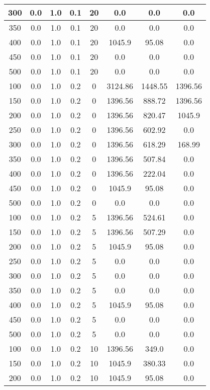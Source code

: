 \documentclass[a4paper, 12pt]{extreport}
\begin{document}
\begin{itemize}
\begin{longtable}{|c|c|c|c|c|c|c|c|}
			300 & 0.0 & 1.0 & 0.1 & 20 & 0.0 & 0.0 & 0.0 \\\hline
			350 & 0.0 & 1.0 & 0.1 & 20 & 0.0 & 0.0 & 0.0 \\\hline
			400 & 0.0 & 1.0 & 0.1 & 20 & 1045.9 & 95.08 & 0.0 \\\hline
			450 & 0.0 & 1.0 & 0.1 & 20 & 0.0 & 0.0 & 0.0 \\\hline
			500 & 0.0 & 1.0 & 0.1 & 20 & 0.0 & 0.0 & 0.0 \\\hline
			100 & 0.0 & 1.0 & 0.2 & 0 & 3124.86 & 1448.55 & 1396.56 \\\hline
			150 & 0.0 & 1.0 & 0.2 & 0 & 1396.56 & 888.72 & 1396.56 \\\hline
			200 & 0.0 & 1.0 & 0.2 & 0 & 1396.56 & 820.47 & 1045.9 \\\hline
			250 & 0.0 & 1.0 & 0.2 & 0 & 1396.56 & 602.92 & 0.0 \\\hline
			300 & 0.0 & 1.0 & 0.2 & 0 & 1396.56 & 618.29 & 168.99 \\\hline
			350 & 0.0 & 1.0 & 0.2 & 0 & 1396.56 & 507.84 & 0.0 \\\hline
			400 & 0.0 & 1.0 & 0.2 & 0 & 1396.56 & 222.04 & 0.0 \\\hline
			450 & 0.0 & 1.0 & 0.2 & 0 & 1045.9 & 95.08 & 0.0 \\\hline
			500 & 0.0 & 1.0 & 0.2 & 0 & 0.0 & 0.0 & 0.0 \\\hline
			100 & 0.0 & 1.0 & 0.2 & 5 & 1396.56 & 524.61 & 0.0 \\\hline
			150 & 0.0 & 1.0 & 0.2 & 5 & 1396.56 & 507.29 & 0.0 \\\hline
			200 & 0.0 & 1.0 & 0.2 & 5 & 1045.9 & 95.08 & 0.0 \\\hline
			250 & 0.0 & 1.0 & 0.2 & 5 & 0.0 & 0.0 & 0.0 \\\hline
			300 & 0.0 & 1.0 & 0.2 & 5 & 0.0 & 0.0 & 0.0 \\\hline
			350 & 0.0 & 1.0 & 0.2 & 5 & 0.0 & 0.0 & 0.0 \\\hline
			400 & 0.0 & 1.0 & 0.2 & 5 & 1045.9 & 95.08 & 0.0 \\\hline
			450 & 0.0 & 1.0 & 0.2 & 5 & 0.0 & 0.0 & 0.0 \\\hline
			500 & 0.0 & 1.0 & 0.2 & 5 & 0.0 & 0.0 & 0.0 \\\hline
			100 & 0.0 & 1.0 & 0.2 & 10 & 1396.56 & 349.0 & 0.0 \\\hline
			150 & 0.0 & 1.0 & 0.2 & 10 & 1045.9 & 380.33 & 0.0 \\\hline
			200 & 0.0 & 1.0 & 0.2 & 10 & 1045.9 & 95.08 & 0.0 \\\hline

\end{longtable}
\end{itemize}
\end{document}
